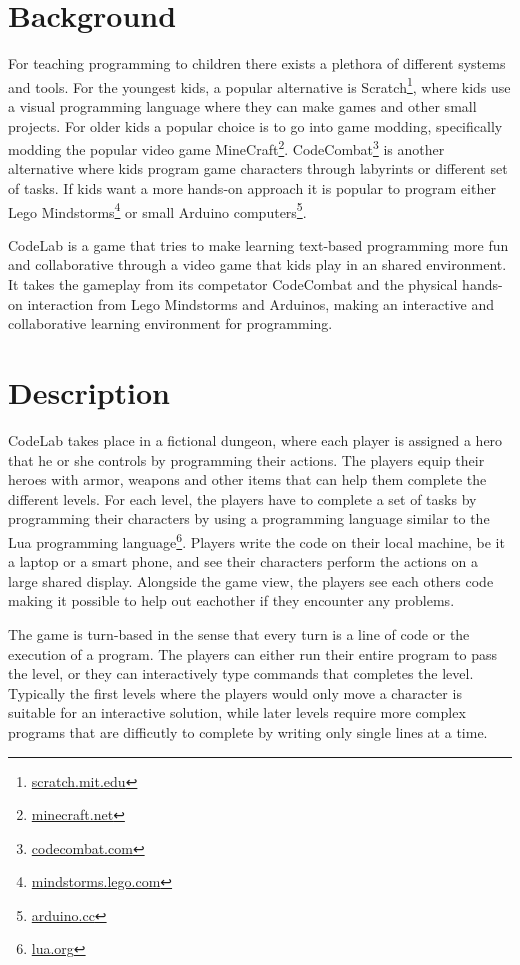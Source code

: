\documentclass[12pt,journal,compsoc, a4paper, onecolumn]{IEEEtran}
\begin{document}
\section{Background} 
For teaching programming to children there exists a plethora of different
systems and tools. For the youngest kids, a popular alternative is
Scratch\footnote{\url{scratch.mit.edu}}, where kids use a visual programming
language where they can make games and other small projects.  For older kids a
popular choice is to go into game modding, specifically modding the popular
video game MineCraft\footnote{\url{minecraft.net}}.
CodeCombat\footnote{\url{codecombat.com}} is another alternative where kids
program game characters through labyrints or different set of tasks. If kids
want a more hands-on approach it is popular to program either Lego
Mindstorms\footnote{\url{mindstorms.lego.com}} or small Arduino
computers\footnote{\url{arduino.cc}}. 

CodeLab is a game that tries to make learning text-based programming more fun
and collaborative through a video game that kids play in an shared environment.
It takes the gameplay from its competator CodeCombat and the physical hands-on
interaction from Lego Mindstorms and Arduinos, making an interactive and
collaborative learning environment for programming. 

\section{Description} 
CodeLab takes place in a fictional dungeon, where each player is assigned a
hero that he or she controls by programming their actions. The players equip
their heroes with armor, weapons and other items that can help them complete the
different levels. For each level, the players have to complete a set of tasks by
programming their characters by using a programming language similar to the 
Lua programming language\footnote{\url{lua.org}}. Players 
write the code on their local machine, be it a laptop or a smart phone, and see
their characters perform the actions on a large shared display. Alongside the
game view, the players see each others code making it possible to help out
eachother if they encounter any problems. 

The game is turn-based in the sense that every turn is a line of code or the
execution of a program. The players can either run their entire program to pass
the level, or they can interactively type commands that completes the level.
Typically the first levels where the players would only move a character is
suitable for an interactive solution, while later levels require more complex
programs that are difficutly to complete by writing only single lines at a time. 
\end{document}
